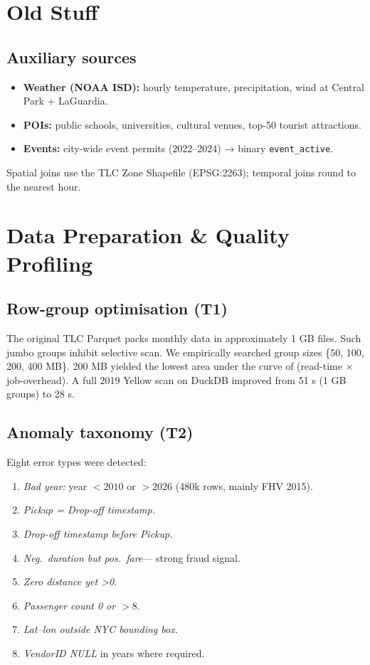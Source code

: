 \documentclass[conference]{IEEEtran}
\begin{document}
\section{Old Stuff}

\subsection{Auxiliary sources}
\begin{itemize}
  \item \textbf{Weather (NOAA ISD):} hourly temperature, precipitation,
    wind at Central Park + LaGuardia.
  \item \textbf{POIs:} public schools, universities, cultural venues,
    top-50 tourist attractions.
  \item \textbf{Events:} city-wide event permits (2022–2024) → binary
    \texttt{event\_active}.
\end{itemize}

Spatial joins use the TLC Zone Shapefile (EPSG:2263);
temporal joins round to the nearest hour.

\section{Data Preparation \& Quality Profiling}\label{sec:prep}
\subsection{Row-group optimisation (T1)}
The original TLC Parquet
packs monthly data in approximately 1 GB files.
Such jumbo groups inhibit selective scan.
We empirically searched group sizes
\{50, 100, 200, 400 MB\}. 200 MB yielded
the lowest area under the curve of
(read-time × job-overhead). A full
2019 Yellow scan on DuckDB improved from
51 s (1 GB groups) to 28 s.

\subsection{Anomaly taxonomy (T2)}
Eight error types were detected:

\begin{enumerate}
  \item \emph{Bad year:} year $<\!2010$ or $>\!2026$
    (480k rows, mainly FHV 2015).
  \item \emph{Pickup = Drop-off timestamp.}
  \item \emph{Drop-off timestamp before Pickup.}
  \item \emph{Neg.\ duration but pos.\ fare}—
    strong fraud signal.
  \item \emph{Zero distance yet \textgreater0}.
  \item \emph{Passenger count 0 or $>\!8$}.
  \item \emph{Lat–lon outside NYC bounding box.}
  \item \emph{VendorID NULL} in years where required.
\end{enumerate}
\end{document}
